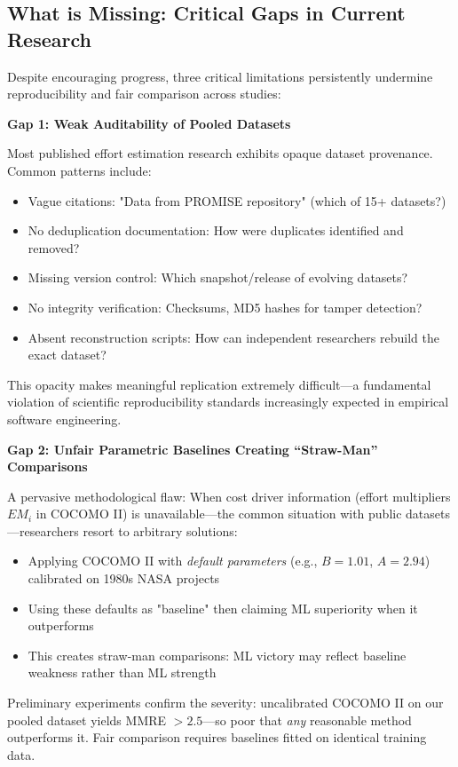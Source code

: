 \documentclass[11pt,a4paper]{article}
\begin{document}
\subsection{What is Missing: Critical Gaps in Current Research}

Despite encouraging progress, three critical limitations persistently undermine reproducibility and fair comparison across studies:

\textbf{Gap 1: Weak Auditability of Pooled Datasets}

Most published effort estimation research exhibits opaque dataset provenance. Common patterns include:
\begin{itemize}
    \item Vague citations: "Data from PROMISE repository" (which of 15+ datasets?)
    \item No deduplication documentation: How were duplicates identified and removed?
    \item Missing version control: Which snapshot/release of evolving datasets?
    \item No integrity verification: Checksums, MD5 hashes for tamper detection?
    \item Absent reconstruction scripts: How can independent researchers rebuild the exact dataset?
\end{itemize}

This opacity makes meaningful replication extremely difficult---a fundamental violation of scientific reproducibility standards increasingly expected in empirical software engineering.

\textbf{Gap 2: Unfair Parametric Baselines Creating ``Straw-Man'' Comparisons}

A pervasive methodological flaw: When cost driver information (effort multipliers $EM_i$ in COCOMO II) is unavailable---the common situation with public datasets---researchers resort to arbitrary solutions:
\begin{itemize}
    \item Applying COCOMO II with \textit{default parameters} (e.g., $B = 1.01$, $A = 2.94$) calibrated on 1980s NASA projects
    \item Using these defaults as "baseline" then claiming ML superiority when it outperforms
    \item This creates straw-man comparisons: ML victory may reflect baseline weakness rather than ML strength
\end{itemize}

Preliminary experiments confirm the severity: uncalibrated COCOMO II on our pooled dataset yields MMRE $> 2.5$---so poor that \textit{any} reasonable method outperforms it. Fair comparison requires baselines fitted on identical training data.
\end{document}
